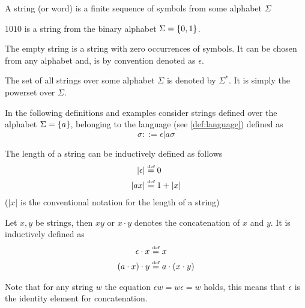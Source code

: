\begin{definition}[String] \label{def:string}
    A string (or word) is a finite sequence of symbols from some alphabet $\Sigma$
\end{definition}

\begin{example}
  $1010$ is a string from the binary alphabet $\Sigma = \left\{ 0,1 \right\}$.
\end{example}

\begin{definition} \label{def:empty-string}
    The empty string is a string with zero occurrences of symbols. It can be chosen from any alphabet and, is by convention denoted as $\epsilon$.
\end{definition}

\begin{definition}
    The set of all strings over some alphabet $\Sigma$ is denoted by $\Sigma^*$. It is simply the powerset over $\Sigma$.
\end{definition}

In the following definitions and examples consider strings defined over the alphabet $\Sigma = \left\{ a \right\}$, belonging to the language (see \ref{def:language}) defined as $$\sigma ::= \epsilon | a\sigma$$

\begin{definition} \label{def:string-length}
    The length of a string can be inductively defined as follows 
    \begin{align*}
        |\epsilon| &\stackrel {\mbox{\tiny def}}{=} 0 \\
        |ax| &\stackrel {\mbox{\tiny def}}{=} 1 + |x|
    \end{align*}
    ($|x|$ is the conventional notation for the length of a string)
\end{definition}

\begin{definition} \label{def:string-concatenation}
    Let $x,y$ be strings, then $xy$ or $x \cdot y$ denotes the concatenation of $x$ and $y$. It is inductively defined as 
    \begin{align*}
        \epsilon \cdot x &\stackrel {\mbox{\tiny def}}{=} x \\
        (a \cdot x) \cdot y &\stackrel {\mbox{\tiny def}}{=} a \cdot (x \cdot y)
    \end{align*}
\end{definition}

Note that for any string $w$ the equation $\epsilon w = w\epsilon = w$ holds, this means that $\epsilon$ is the identity element for concatenation. 

